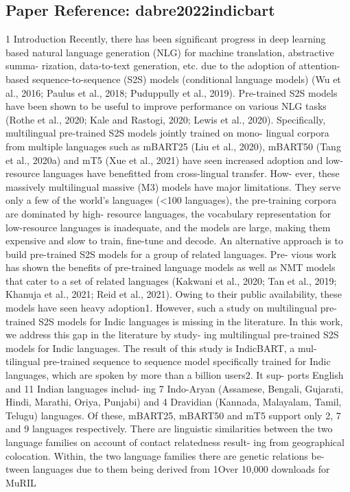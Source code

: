 

\subsection*{Paper Reference: dabre2022indicbart}

1 Introduction Recently, there has been signiﬁcant progress in deep learning based natural language generation (NLG) for machine translation, abstractive summa- rization, data-to-text generation, etc. due to the adoption of attention-based sequence-to-sequence (S2S) models (conditional language models) (Wu et al., 2016; Paulus et al., 2018; Puduppully et al., 2019). Pre-trained S2S models have been shown to be useful to improve performance on various NLG tasks (Rothe et al., 2020; Kale and Rastogi, 2020; Lewis et al., 2020). Speciﬁcally, multilingual pre-trained S2S models jointly trained on mono- lingual corpora from multiple languages such as mBART25 (Liu et al., 2020), mBART50 (Tang et al., 2020a) and mT5 (Xue et al., 2021) have seen increased adoption and low-resource languages have beneﬁtted from cross-lingual transfer. How- ever, these massively multilingual massive (M3) models have major limitations. They serve only a few of the world’s languages (<100 languages), the pre-training corpora are dominated by high- resource languages, the vocabulary representation for low-resource languages is inadequate, and the models are large, making them expensive and slow to train, ﬁne-tune and decode. An alternative approach is to build pre-trained S2S models for a group of related languages. Pre- vious work has shown the beneﬁts of pre-trained language models as well as NMT models that cater to a set of related languages (Kakwani et al., 2020; Tan et al., 2019; Khanuja et al., 2021; Reid et al., 2021). Owing to their public availability, these models have seen heavy adoption1. However, such a study on multilingual pre-trained S2S models for Indic languages is missing in the literature. In this work, we address this gap in the literature by study- ing multilingual pre-trained S2S models for Indic languages. The result of this study is IndicBART, a mul- tilingual pre-trained sequence to sequence model speciﬁcally trained for Indic languages, which are spoken by more than a billion users2. It sup- ports English and 11 Indian languages includ- ing 7 Indo-Aryan (Assamese, Bengali, Gujarati, Hindi, Marathi, Oriya, Punjabi) and 4 Dravidian (Kannada, Malayalam, Tamil, Telugu) languages. Of these, mBART25, mBART50 and mT5 support only 2, 7 and 9 languages respectively. There are linguistic similarities between the two language families on account of contact relatedness result- ing from geographical colocation. Within, the two language families there are genetic relations be- tween languages due to them being derived from 1Over 10,000 downloads for MuRIL 